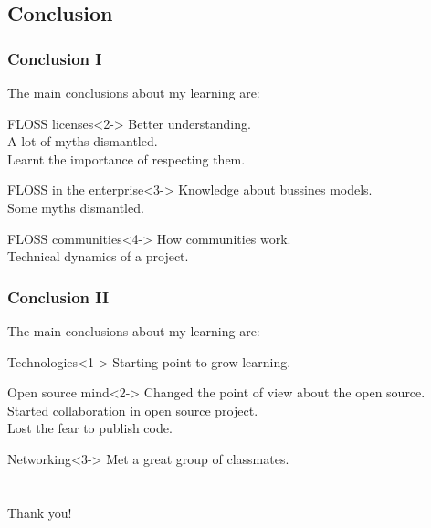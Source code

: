 \documentclass[slidestop,compress,mathserif]{beamer}
\begin{document}
\subsection{Conclusion}
\begin{frame}
  \frametitle{Conclusion I}

  The main conclusions about my learning are:
  
  \begin{block}{FLOSS licenses}<2->
    Better understanding.\\
    A lot of myths dismantled.\\
    Learnt the importance of respecting them.
  \end{block}

  \begin{block}{FLOSS in the enterprise}<3->
    Knowledge about bussines models.\\
    Some myths dismantled.
  \end{block}

  \begin{block}{FLOSS communities}<4->
    How communities work.\\
    Technical dynamics of a project.
  \end{block}
\end{frame}

\begin{frame}
  \frametitle{Conclusion II}

  The main conclusions about my learning are:
  
  \begin{block}{Technologies}<1->
    Starting point to grow learning.
  \end{block}

  \begin{block}{Open source mind}<2->
    Changed the point of view about the open source.\\
    Started collaboration in open source project.\\
    Lost the fear to publish code.
  \end{block}

  \begin{block}{Networking}<3->
    Met a great group of classmates.
  \end{block}
\end{frame}

\section{}
\begin{frame}
  \vspace*{\fill}
  \begin{center}
    {\Huge Thank you!}
  \end{center}
\end{frame}
\end{document}
